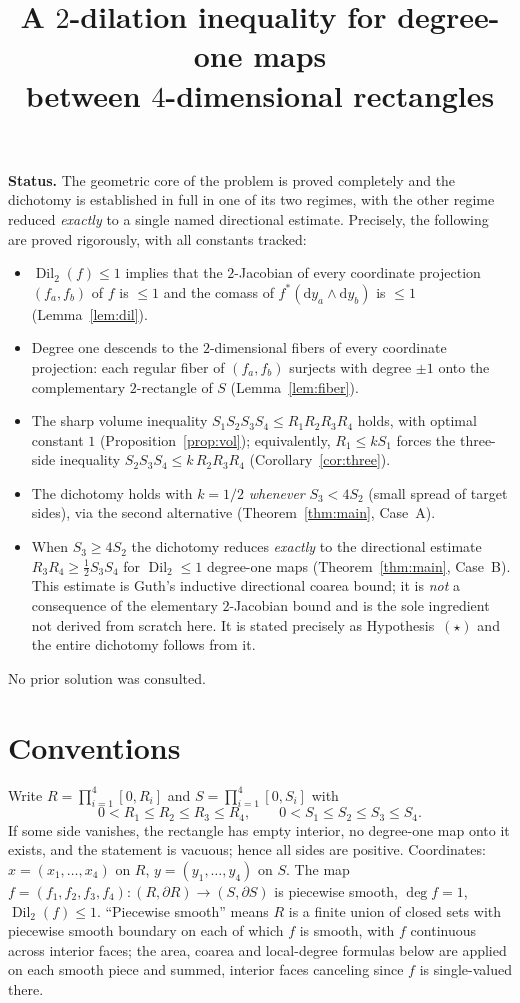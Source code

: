 \documentclass[11pt]{article}
\title{A $2$-dilation inequality for degree-one maps\\ between $4$-dimensional rectangles}
\author{}
\date{}
\theoremstyle{remark}
\newcommand{\Dil}{\operatorname{Dil}}
\newcommand{\dd}{\mathrm{d}}
\begin{document}
\maketitle

\noindent\textbf{Status.}
The geometric core of the problem is proved completely and the dichotomy is established in
full in one of its two regimes, with the other regime reduced \emph{exactly} to a single
named directional estimate. Precisely, the following are proved rigorously, with all
constants tracked:
\begin{itemize}
\item[(I)] $\Dil_2(f)\le1$ implies that the $2$-Jacobian of every coordinate projection
$(f_a,f_b)$ of $f$ is $\le1$ and the comass of $f^*(\dd y_a\wedge \dd y_b)$ is $\le1$
(Lemma~\ref{lem:dil}).
\item[(II)] Degree one descends to the $2$-dimensional fibers of every coordinate
projection: each regular fiber of $(f_a,f_b)$ surjects with degree $\pm1$ onto the
complementary $2$-rectangle of $S$ (Lemma~\ref{lem:fiber}).
\item[(III)] The sharp volume inequality $S_1S_2S_3S_4\le R_1R_2R_3R_4$ holds, with optimal
constant $1$ (Proposition~\ref{prop:vol}); equivalently, $R_1\le kS_1$ forces the
three-side inequality $S_2S_3S_4\le k\,R_2R_3R_4$ (Corollary~\ref{cor:three}).
\item[(IV)] The dichotomy holds with $k=1/2$ \emph{whenever} $S_3<4S_2$ (small spread of
target sides), via the second alternative (Theorem~\ref{thm:main}, Case~A).
\item[(V)] When $S_3\ge4S_2$ the dichotomy reduces \emph{exactly} to the directional
estimate $R_3R_4\ge\tfrac12 S_3S_4$ for $\Dil_2\le1$ degree-one maps
(Theorem~\ref{thm:main}, Case~B). This estimate is Guth's inductive directional coarea
bound; it is \emph{not} a consequence of the elementary $2$-Jacobian bound and is the sole
ingredient not derived from scratch here. It is stated precisely as Hypothesis~$(\star)$
and the entire dichotomy follows from it.
\end{itemize}
No prior solution was consulted.

\section{Conventions}

Write $R=\prod_{i=1}^4[0,R_i]$ and $S=\prod_{i=1}^4[0,S_i]$ with
\[
0<R_1\le R_2\le R_3\le R_4,\qquad 0<S_1\le S_2\le S_3\le S_4 .
\]
If some side vanishes, the rectangle has empty interior, no degree-one map onto it exists,
and the statement is vacuous; hence all sides are positive. Coordinates: $x=(x_1,\dots,x_4)$
on $R$, $y=(y_1,\dots,y_4)$ on $S$. The map
$f=(f_1,f_2,f_3,f_4)\colon(R,\partial R)\to(S,\partial S)$ is piecewise smooth,
$\deg f=1$, $\Dil_2(f)\le1$. ``Piecewise smooth'' means $R$ is a finite union of closed
sets with piecewise smooth boundary on each of which $f$ is smooth, with $f$ continuous
across interior faces; the area, coarea and local-degree formulas below are applied on each
smooth piece and summed, interior faces canceling since $f$ is single-valued there.
\end{document}
